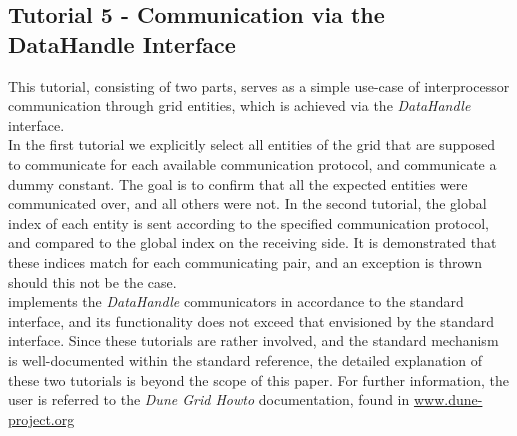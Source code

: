 

\subsection{Tutorial 5 - Communication via the DataHandle Interface}
\label{usage-howto-tutorial-communication}

This tutorial, consisting of two parts, serves as a simple use-case of interprocessor communication through grid entities, which is achieved via the \textit{DataHandle} interface. \\

\noindent
In the first tutorial we explicitly select all entities of the grid that are supposed to communicate for each available communication protocol, and communicate a dummy constant. The goal is to confirm that all the expected entities were communicated over, and all others were not. In the second tutorial, the global index of each entity is sent according to the specified communication protocol, and compared to the global index on the receiving side. It is demonstrated that these indices match for each communicating pair, and an exception is thrown should this not be the case. \\


\noindent
\curvgrid{} implements the \textit{DataHandle} communicators in accordance to the standard \dune{} interface, and its functionality does not exceed that envisioned by the standard interface. Since these tutorials are rather involved, and the standard mechanism is well-documented within the standard \dune{} reference, the detailed explanation of these two tutorials is beyond the scope of this paper. For further information, the user is referred to the \textit{Dune Grid Howto} documentation, found in \url{www.dune-project.org}



